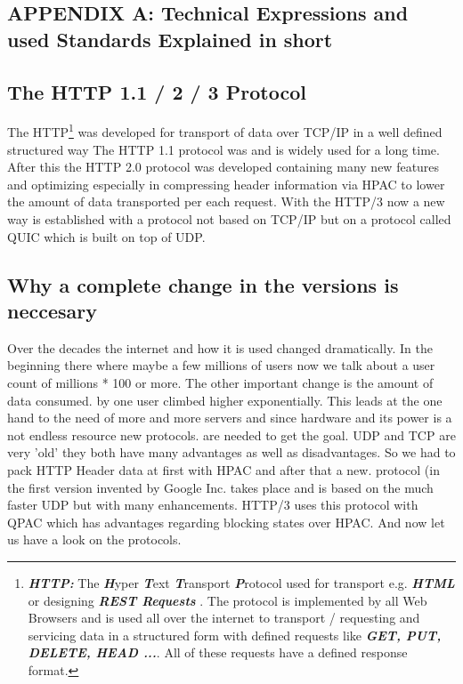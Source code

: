 \documentclass[10pt,a4paper,english]{article}
\newcommand{\abbrhighcol}[1]{\textbf{\textit{#1}}}
\begin{document}
\begin{multicols}{2}
\section{APPENDIX A: Technical Expressions and used Standards Explained in short}
\subsection{The HTTP 1.1 / 2 / 3 Protocol}   
\begin{flushleft}
The HTTP\footnote{\abbrhighcol{HTTP:}  The \abbrhighcol{H}yper \abbrhighcol{T}ext \abbrhighcol {T}ransport \abbrhighcol {P}rotocol used for transport  e.g. \abbrhighcol{HTML} or designing  \abbrhighcol{REST Requests} . The protocol is implemented by all Web Browsers and is used all over the internet to transport / requesting and servicing data in a structured form with defined requests like \abbrhighcol{GET, PUT, DELETE, HEAD ...}. All of these requests have a defined response format.} was developed for transport of data over TCP/IP in a well defined structured way  
The HTTP 1.1 protocol was and is widely used for a long time.
After this the HTTP 2.0 protocol was developed containing many new features and optimizing especially in compressing header information via HPAC to lower the amount of data transported per each request.
With the HTTP/3 now a new way is established with a protocol not based on TCP/IP but on a protocol called QUIC which is built on top of UDP.
\end{flushleft}
\subsection{Why a complete change in the versions is neccesary }
\begin{flushleft}
Over the decades the internet and how it is used changed dramatically. In the beginning there where maybe a few millions of users now we talk about a user count of millions * 100 or more. The other important change is the amount of data consumed. by one user climbed higher exponentially. This leads at the one hand to the need of more and more servers and since hardware and its power is a not endless resource new protocols. are needed to get the goal. UDP and TCP are very 'old' they both have many advantages as well as disadvantages. So we had to pack HTTP Header data at first with HPAC and after that a new. protocol (in the first version invented by Google Inc. takes place and is based on the much faster UDP but with many enhancements. HTTP/3 uses this protocol with QPAC which has advantages regarding blocking states over HPAC. And now let us have a look on the protocols.
       

\end{flushleft}
\end{multicols}
\end{document}
